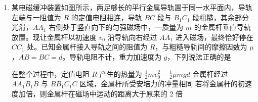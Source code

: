 \documentclass[\gkver]{gaokaozhenti}
\begin{document}
\begin{enumerate}
{由于第一宇宙速度为近地卫星的环绕速度，同理可得 $v_{\text{地}}=\sqrt{g_{\text{地}}r_{\text{地}}}$

代入题中数据可得 $v_{\text{月}}=\frac{\sqrt{6}}{12}v_{\text{地}}$

故 A 错误、B 正确；

CD．根据线速度和周期的关系有 $T=\frac{2\pi}{v}\cdot r$

根据以上分析可得 $T_{\text{月}}=\sqrt{\frac{3}{2}}T_{\text{地}}$

故 C 错误、D 正确。

故选 BD。
}

\item
某电磁缓冲装置如图所示，两足够长的平行金属导轨置于同一水平面内，导轨左端与一阻值为 $R$ 的定值电阻相连，导轨 $BC$ 段与 $B_{1}C_{1}$ 段粗糙，其余部分光滑，$AA_{1}$ 右侧处于竖直向下的匀强磁场中，一质量为 $m$ 的金属杆垂直导轨放置。现让金属杆以初速度 $v_{0}$ 沿导轨向右经过 $AA_{1}$ 进入磁场，最终恰好停在 $CC_{1}$ 处。已知金属杆接入导轨之间的阻值为 $R$，与粗糙导轨间的摩擦因数为 $\mu$，$AB = BC = d$。导轨电阻不计，重力加速度为 $g$，下列说法正确的是


{在整个过程中，定值电阻 $R$ 产生的热量为 $\frac{1}{2}mv_{0}^{2} - \frac{1}{2}\mu mgd$}
{金属杆经过 $AA_{1}B_{1}B$ 与 $BB_{1}C_{1}C$ 区域，金属杆所受安培力的冲量相同}
{若将金属杆的初速度加倍，则金属杆在磁场中运动的距离大于原来的 2 倍}

\end{enumerate}
\end{document}

